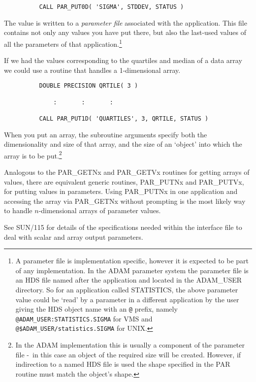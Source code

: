 \documentclass[twoside,11pt]{article}
\newcommand{\xref}[3]{#1}
\newcommand{\dash}{--}
\renewcommand{\dash}{-}
\begin{document}
\begin{verbatim}
          CALL PAR_PUT0D( 'SIGMA', STDDEV, STATUS )
\end{verbatim}

The value is written to a {\em parameter file\/} associated with the
application.  This file contains not only any values you have put there,
but also the last-used values of all the parameters of that
application.\footnote{A parameter file is implementation specific,
however it is expected to be part of any implementation.  In the ADAM
parameter system the parameter file is an HDS file named after the
application and located in the ADAM\_USER directory. So for an application
called STATISTICS, the above parameter value could be `read' by a
parameter in a different application by the user giving the HDS object
name with an {\tt @} prefix, namely {\tt @ADAM\_USER:STATISTICS.SIGMA}
for VMS and {\tt @\$ADAM\_USER/statistics.SIGMA} for UNIX.} 

If we had the values corresponding to the quartiles and median of a
data array we could use a routine that handles a 1-dimensional array.
\begin{verbatim}
          DOUBLE PRECISION QRTILE( 3 )

              :       :       :

          CALL PAR_PUT1D( 'QUARTILES', 3, QRTILE, STATUS )
\end{verbatim}

When you put an array, the subroutine arguments specify both the
dimensionality and size of that array, and the size of an `object' into
which the array is to be put.\footnote{In the ADAM implementation this
is usually a component of the parameter file \dash\ in this case an object of
the required size will be created.  However, if indirection to a named
HDS file is used the shape specified in the PAR routine must match the
object's shape.} 

Analogous to the PAR\_GETNx and PAR\_GETVx routines for getting arrays
of values, there are equivalent generic routines, PAR\_PUTNx and
PAR\_PUTVx, for putting values in parameters.  Using PAR\_PUTNx in one
application and accessing the array via PAR\_GETNx without prompting is
the most likely way to handle $n$-dimensional arrays of parameter
values. 

See 
\xref{SUN/115}{sun115}{parameter_specification_for_output_parameters} 
 for details of the specifications needed within
the interface file to deal with scalar and array output parameters. 
\end{document}
